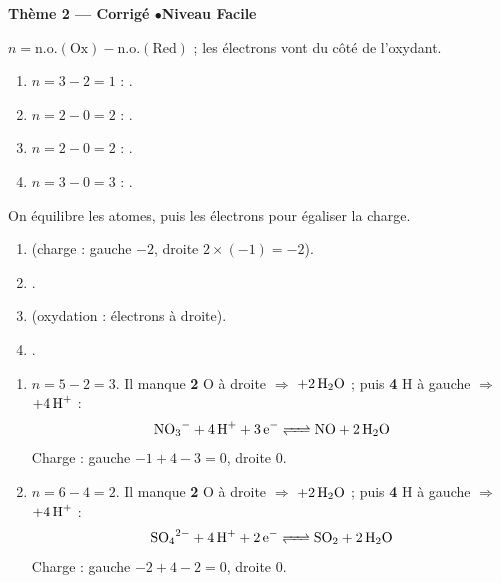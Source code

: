 \documentclass[11pt,a4paper]{article}
\begin{document}
\begin{center}\color{primarydark}\large\bfseries Thème 2 — Corrigé \quad$\bullet$\quad Niveau Facile\end{center}

\begin{corrige}
$n=\mathrm{n.o.}(\text{Ox})-\mathrm{n.o.}(\text{Red})$ ; les électrons vont du côté de l'oxydant.
\begin{enumerate}[label=\alph*)]
  \item $n=3-2=1$ : .
  \item $n=2-0=2$ : .
  \item $n=2-0=2$ : .
  \item $n=3-0=3$ : .
\end{enumerate}
\end{corrige}

\begin{corrige}
On équilibre les atomes, puis les électrons pour égaliser la charge.
\begin{enumerate}[label=\alph*)]
  \item {} (charge : gauche $-2$, droite $2\times(-1)=-2$).
  \item {}.
  \item {} (oxydation : électrons à droite).
  \item {}.
\end{enumerate}
\end{corrige}

\begin{corrige}
\begin{enumerate}[label=\alph*)]
  \item $n=5-2=3$. Il manque \textbf{2} O à droite $\Rightarrow$ $+2\,\ce{H2O}$ ; puis \textbf{4} H à
        gauche $\Rightarrow$ $+4\,\ce{H+}$ :
        \[\ce{NO3^- + 4 H+ + 3 e^- <=> NO + 2 H2O}\]
        Charge : gauche $-1+4-3=0$, droite $0$. \checkmark
  \item $n=6-4=2$. Il manque \textbf{2} O à droite $\Rightarrow$ $+2\,\ce{H2O}$ ; puis \textbf{4} H à
        gauche $\Rightarrow$ $+4\,\ce{H+}$ :
        \[\ce{SO4^{2-} + 4 H+ + 2 e^- <=> SO2 + 2 H2O}\]
        Charge : gauche $-2+4-2=0$, droite $0$. \checkmark
\end{enumerate}
\end{corrige}
\end{document}
